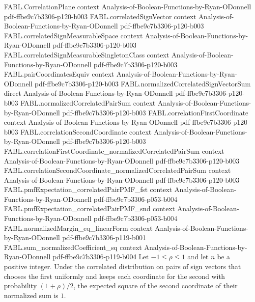 \begin{theorem}
\proofstep
  {FABL.CorrelationPlane}
  {context}
  {Analysis-of-Boolean-Functions-by-Ryan-ODonnell}
  {pdf-ffbe9c7b3306-p120-b003}
\proofstep
  {FABL.correlatedSignVector}
  {context}
  {Analysis-of-Boolean-Functions-by-Ryan-ODonnell}
  {pdf-ffbe9c7b3306-p120-b003}
\proofstep
  {FABL.correlatedSignMeasurableSpace}
  {context}
  {Analysis-of-Boolean-Functions-by-Ryan-ODonnell}
  {pdf-ffbe9c7b3306-p120-b003}
\proofstep
  {FABL.correlatedSignMeasurableSingletonClass}
  {context}
  {Analysis-of-Boolean-Functions-by-Ryan-ODonnell}
  {pdf-ffbe9c7b3306-p120-b003}
\proofstep
  {FABL.pairCoordinatesEquiv}
  {context}
  {Analysis-of-Boolean-Functions-by-Ryan-ODonnell}
  {pdf-ffbe9c7b3306-p120-b003}
\proofstep
  {FABL.normalizedCorrelatedSignVectorSum}
  {direct}
  {Analysis-of-Boolean-Functions-by-Ryan-ODonnell}
  {pdf-ffbe9c7b3306-p120-b003}
\proofstep
  {FABL.normalizedCorrelatedPairSum}
  {context}
  {Analysis-of-Boolean-Functions-by-Ryan-ODonnell}
  {pdf-ffbe9c7b3306-p120-b003}
\proofstep
  {FABL.correlationFirstCoordinate}
  {context}
  {Analysis-of-Boolean-Functions-by-Ryan-ODonnell}
  {pdf-ffbe9c7b3306-p120-b003}
\proofstep
  {FABL.correlationSecondCoordinate}
  {context}
  {Analysis-of-Boolean-Functions-by-Ryan-ODonnell}
  {pdf-ffbe9c7b3306-p120-b003}
\proofstep
  {FABL.correlationFirstCoordinate_normalizedCorrelatedPairSum}
  {context}
  {Analysis-of-Boolean-Functions-by-Ryan-ODonnell}
  {pdf-ffbe9c7b3306-p120-b003}
\proofstep
  {FABL.correlationSecondCoordinate_normalizedCorrelatedPairSum}
  {context}
  {Analysis-of-Boolean-Functions-by-Ryan-ODonnell}
  {pdf-ffbe9c7b3306-p120-b003}
\proofstep
  {FABL.pmfExpectation_correlatedPairPMF_fst}
  {context}
  {Analysis-of-Boolean-Functions-by-Ryan-ODonnell}
  {pdf-ffbe9c7b3306-p053-b004}
\proofstep
  {FABL.pmfExpectation_correlatedPairPMF_snd}
  {context}
  {Analysis-of-Boolean-Functions-by-Ryan-ODonnell}
  {pdf-ffbe9c7b3306-p053-b004}
\proofstep
  {FABL.normalizedMargin_eq_linearForm}
  {context}
  {Analysis-of-Boolean-Functions-by-Ryan-ODonnell}
  {pdf-ffbe9c7b3306-p119-b001}
\proofstep
  {FABL.sum_normalizedCoefficient_sq}
  {context}
  {Analysis-of-Boolean-Functions-by-Ryan-ODonnell}
  {pdf-ffbe9c7b3306-p119-b004}
Let $-1\leq \rho\leq 1$ and let $n$ be a positive integer. Under the correlated
distribution on pairs of sign vectors that chooses the first uniformly and keeps each
coordinate for the second with probability $(1+\rho)/2$, the expected square of the
second coordinate of their normalized sum is $1$.
\end{theorem}

